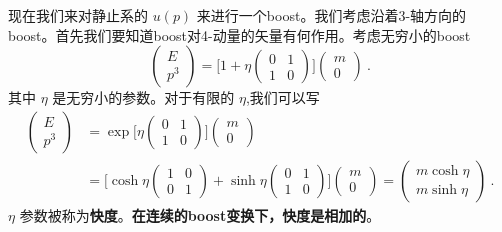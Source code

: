 现在我们来对静止系的 $u(p)$ 来进行一个boost。我们考虑沿着3-轴方向的boost。首先我们要知道boost对4-动量的矢量有何作用。考虑无穷小的boost
\begin{equation}
\begin{pmatrix}
E \\ p^3
\end{pmatrix} = \bigg[ 1 + \eta \begin{pmatrix}
0 & 1 \\
1 & 0 
\end{pmatrix} \bigg] \begin{pmatrix}
m \\ 0
\end{pmatrix}~.
\end{equation}
其中 $\eta$ 是无穷小的参数。对于有限的 $\eta$,我们可以写
\begin{equation}
\begin{aligned}\nonumber
\begin{pmatrix}
E \\ p^3
\end{pmatrix} & = \exp \bigg[ \eta \begin{pmatrix}
0 & 1 \\
1& 0
\end{pmatrix} \bigg]\begin{pmatrix}
m \\ 0
\end{pmatrix} \\
& = \bigg[ \cosh \eta \begin{pmatrix}
1 & 0 \\ 0 & 1
\end{pmatrix} + \sinh \eta \begin{pmatrix}
0 & 1 \\
1 & 0
\end{pmatrix}\bigg]\begin{pmatrix}
m \\ 0
\end{pmatrix} = \begin{pmatrix}
m \cosh \eta \\ m \sinh \eta
\end{pmatrix}~.
\end{aligned}
\end{equation}
$\eta$ 参数被称为\textbf{快度}。\textbf{在连续的boost变换下，快度是相加的}。
